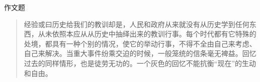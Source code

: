 \documentclass[answer=true,countunit=none,sheetsize=A4,paperprint=double,scoretable]{simplexam}
\begin{document}




\begin{question}
作文题
\begin{quotation}
  \large \kaishu 经验或曰历史给我们的教训却是，人民和政府从来就没有从历史学到任何东西，从未依照本应从从历史中抽绎出来的教训行事。每个时代都有它特殊的处境，都具有一种个别的情况，使它的举动行事，不得不全由自己来考虑、自己来解决。当重大事件纷乘交迫的时候，一般笼统的信条毫无裨益。回忆过去的同样情形，也是徒劳无功的。一个灰色的回忆不能抗衡``现在''的生动和自由。
\end{quotation}
\answerpoints
\end{question}

%
\end{document}
